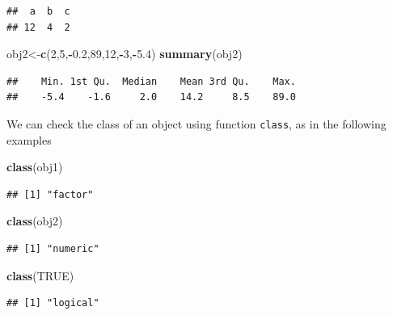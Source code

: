 \documentclass[
]{article}
\newenvironment{Shaded}{\begin{snugshade}}{\end{snugshade}}
\newcommand{\ConstantTok}[1]{\textcolor[rgb]{0.56,0.35,0.01}{#1}}
\newcommand{\DecValTok}[1]{\textcolor[rgb]{0.00,0.00,0.81}{#1}}
\newcommand{\FloatTok}[1]{\textcolor[rgb]{0.00,0.00,0.81}{#1}}
\newcommand{\FunctionTok}[1]{\textcolor[rgb]{0.13,0.29,0.53}{\textbf{#1}}}
\newcommand{\NormalTok}[1]{#1}
\newcommand{\OtherTok}[1]{\textcolor[rgb]{0.56,0.35,0.01}{#1}}
\newcommand{\SpecialCharTok}[1]{\textcolor[rgb]{0.81,0.36,0.00}{\textbf{#1}}}
\begin{document}
\begin{verbatim}
##  a  b  c 
## 12  4  2
\end{verbatim}

\begin{Shaded}
\begin{Highlighting}[]
\NormalTok{obj2}\OtherTok{\textless{}{-}}\FunctionTok{c}\NormalTok{(}\DecValTok{2}\NormalTok{,}\DecValTok{5}\NormalTok{,}\SpecialCharTok{{-}}\FloatTok{0.2}\NormalTok{,}\DecValTok{89}\NormalTok{,}\DecValTok{12}\NormalTok{,}\SpecialCharTok{{-}}\DecValTok{3}\NormalTok{,}\SpecialCharTok{{-}}\FloatTok{5.4}\NormalTok{)}
\FunctionTok{summary}\NormalTok{(obj2)}
\end{Highlighting}
\end{Shaded}

\begin{verbatim}
##    Min. 1st Qu.  Median    Mean 3rd Qu.    Max. 
##    -5.4    -1.6     2.0    14.2     8.5    89.0
\end{verbatim}

We can check the class of an object using function \texttt{class}, as in
the following examples

\begin{Shaded}
\begin{Highlighting}[]
\FunctionTok{class}\NormalTok{(obj1)}
\end{Highlighting}
\end{Shaded}

\begin{verbatim}
## [1] "factor"
\end{verbatim}

\begin{Shaded}
\begin{Highlighting}[]
\FunctionTok{class}\NormalTok{(obj2)}
\end{Highlighting}
\end{Shaded}

\begin{verbatim}
## [1] "numeric"
\end{verbatim}

\begin{Shaded}
\begin{Highlighting}[]
\FunctionTok{class}\NormalTok{(}\ConstantTok{TRUE}\NormalTok{)}
\end{Highlighting}
\end{Shaded}

\begin{verbatim}
## [1] "logical"
\end{verbatim}
\end{document}
